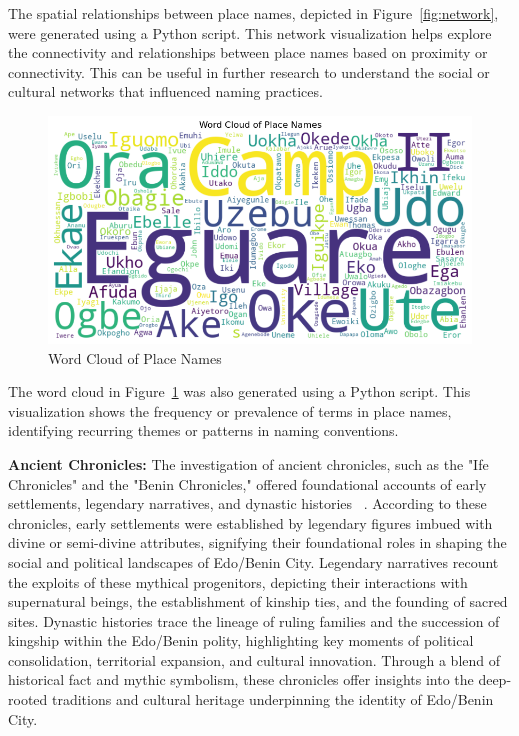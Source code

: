 The spatial relationships between place names, depicted in Figure~\ref{fig:network}, were generated using a Python script. This network visualization helps explore the connectivity and relationships between place names based on proximity or connectivity. This can be useful in further research to understand the social or cultural networks that influenced naming practices.

\begin{figure}[H]
    \centering
    \includegraphics[width=1\linewidth]{wordcloud.png}
    \caption{Word Cloud of Place Names}
    \label{fig:wordcloud}
\end{figure}

The word cloud in Figure~\ref{fig:wordcloud} was also generated using a Python script. This visualization shows the frequency or prevalence of terms in place names, identifying recurring themes or patterns in naming conventions.

\textbf{Ancient Chronicles:} The investigation of ancient chronicles, such as the "Ife Chronicles" and the "Benin Chronicles," offered foundational accounts of early settlements, legendary narratives, and dynastic histories ~\cite{otterbein1966}. According to these chronicles, early settlements were established by legendary figures imbued with divine or semi-divine attributes, signifying their foundational roles in shaping the social and political landscapes of Edo/Benin City. Legendary narratives recount the exploits of these mythical progenitors, depicting their interactions with supernatural beings, the establishment of kinship ties, and the founding of sacred sites. Dynastic histories trace the lineage of ruling families and the succession of kingship within the Edo/Benin polity, highlighting key moments of political consolidation, territorial expansion, and cultural innovation. Through a blend of historical fact and mythic symbolism, these chronicles offer insights into the deep-rooted traditions and cultural heritage underpinning the identity of Edo/Benin City.